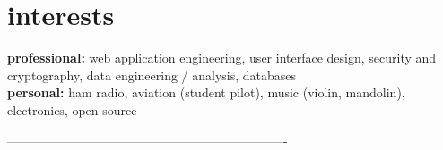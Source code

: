 \documentclass[]{friggeri-cv} %
\begin{document}

\section{interests}

\textbf{professional:} web application engineering, user interface design, security and cryptography, data engineering / analysis, databases
\\
\textbf{personal:} ham radio, aviation (student pilot), music (violin, mandolin), electronics, open source

-------------------------------------------------------------------
\end{document}
